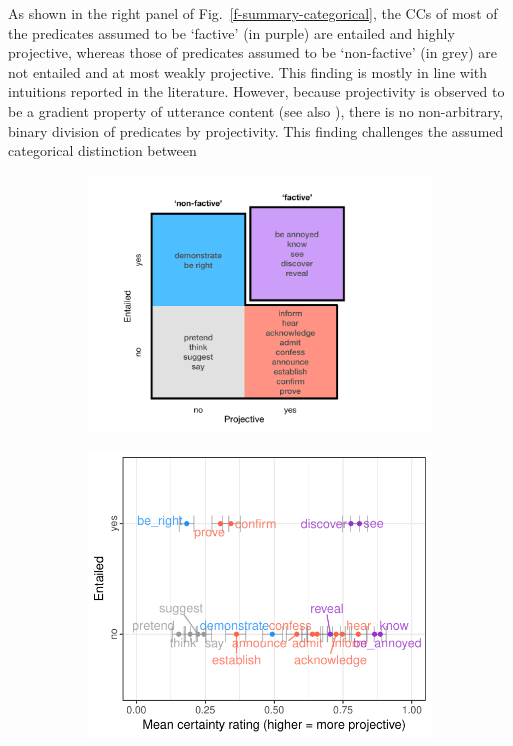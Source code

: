 \documentclass[12pt,fleqn]{article}
\newcommand{\6}{\mbox{$[\hspace*{-.6mm}[$}}
\newcommand{\9}{\mbox{$]\hspace*{-.6mm}]$}}
\begin{document}
 As shown in the right panel of Fig.\ \ref{f-summary-categorical}, the CCs of most of the predicates assumed to be `factive' (in purple) are entailed and highly projective, whereas those of predicates assumed to be `non-factive' (in grey) are not entailed and at most weakly projective. This finding is mostly in line with intuitions reported in the literature. However, because projectivity is observed to be a gradient property of utterance content (see also \cite{tbd-variability}), there is no non-arbitrary, binary division of predicates by projectivity. This finding challenges the assumed categorical distinction between \vspace{-1.15em}
\begin{figure}
\begin{subfigure}{.35\textwidth}
\centering
\includegraphics[width=.27\paperwidth]{../paper/figures/categorization}
\end{subfigure} %
\begin{subfigure}{.3\textwidth}
\centering
\includegraphics[width=.3\paperwidth]{../results/5-projectivity-no-fact/graphs/projection-by-inferenceEntailment}
\end{subfigure}


\end{figure}
\end{document}
